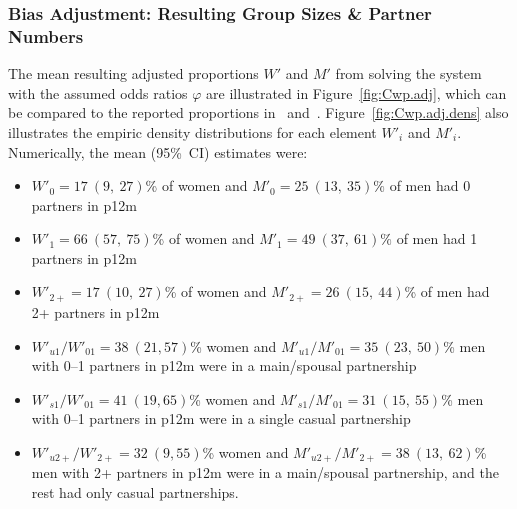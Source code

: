 \subsubsection{Bias Adjustment: Resulting Group Sizes \& Partner Numbers}\label{model.par.nsw.res}
The mean resulting adjusted proportions $W'$ and $M'$
from solving the system with the assumed odds ratios $\varphi$
are illustrated in Figure~\ref{fig:Cwp.adj}, which can be compared to
the reported proportions in ~and~.
Figure~\ref{fig:Cwp.adj.dens} also illustrates the empiric density distributions
for each element $W'_{i}$ and $M'_{i}$.
Numerically, the mean (95\%~CI) estimates were:
\begin{itemize}
  \item $W'_{0} = 17~(9,~27)$\% of women and $M'_{0} = 25~(13,~35)\%$ of men had 0 partners in p12m
  \item $W'_{1} = 66~(57,~75)$\% of women and $M'_{1} = 49~(37,~61)\%$ of men had 1 partners in p12m
  \item $W'_{2+} = 17~(10,~27)$\% of women and $M'_{2+} = 26~(15,~44)$\% of men had 2+ partners in p12m
  \item $W'_{u1} / W'_{01} = 38~(21,57)$\% women and $M'_{u1} / M'_{01} = 35~(23,~50)$\% men
    with 0--1 partners in p12m were in a main/spousal partnership
  \item $W'_{s1} / W'_{01} = 41~(19,65)$\% women and $M'_{s1} / M'_{01} = 31~(15,~55)$\% men
    with 0--1 partners in p12m were in a single casual partnership
  \item $W'_{u2+} / W'_{2+} = 32~(9,55)$\% women and $M'_{u2+} / M'_{2+} = 38~(13,~62)$\% men
    with 2+ partners in p12m were in a main/spousal partnership,
    and the rest had only casual partnerships.
\end{itemize}

